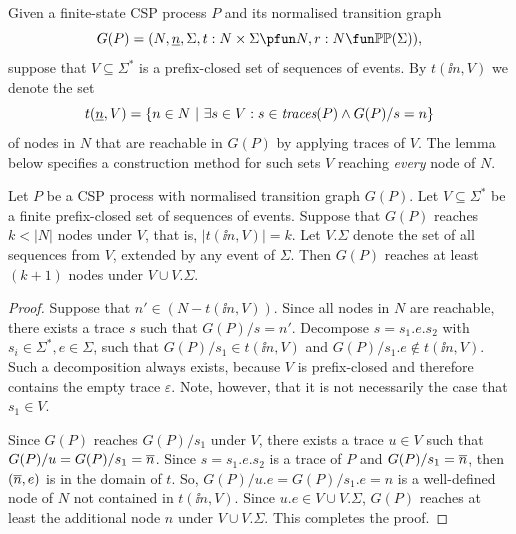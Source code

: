 
Given a finite-state CSP process $P$ and its normalised transition graph
\[
G(P) = ( N, \ii n, \Sigma, t : N\times\Sigma \pfun N, r : N \fun \mathbb{P}\mathbb{P}(\Sigma)),
\]
suppose that $V\subseteq\Sigma^*$ is a
prefix-closed set  of sequences of events. By $t(\ii n,V)$ we denote the set
\[
t(\underline{n},V) = \{ n\in N~|~\exists s\in V: s\in\text{\it traces}(P)\wedge G(P)/s = n \}
\]
of nodes in $N$ that are reachable in $G(P)$ by applying traces of $V$. The
lemma below specifies a construction method for such sets $V$ reaching {\it
every} node of $N$.

\begin{lemma}
\label{lemma:extendV} Let $P$ be a CSP process with normalised transition
graph $G(P)$. %
Let
$V\subseteq\Sigma^*$ be a finite prefix-closed set of sequences of events.
Suppose that  $G(P)$ reaches $k < |N|$ nodes under $V$, that is, $|t(\ii
n,V)| = k$. Let $V.\Sigma$ denote the set of all sequences from $V$, extended
by any event of $\Sigma$. Then $G(P)$ reaches at least $(k+1)$ nodes under
$V\cup V.\Sigma$.
\end{lemma}
\begin{proof}
Suppose that $n'\in (N - t(\ii n,V))$.  Since all nodes in $N$ are reachable,
there exists a trace $s$ such that $G(P)/s = n'$. Decompose $s = s_1.e.s_2$
with $s_i\in\Sigma^*, e\in\Sigma$, such that $G(P)/s_1 \in t(\ii n,V)$ and
$G(P)/s_1.e \not\in t(\ii n,V)$. Such a decomposition always exists, because
$V$ is prefix-closed and therefore contains the empty trace $\varepsilon$.
Note, however, that it is not necessarily the case that $s_1\in V$.

Since $G(P)$ reaches $G(P)/s_1$ under $V$, there exists a trace $u\in V$ such
that $G(P)/u = G(P)/s_1 = \overline n$. Since $s = s_1.e.s_2$ is a trace of $P$ and
$G(P)/s_1 = \overline n$, then $(\overline n,e)$ is in the domain of $t$. So, $ G(P)/u.e
= G(P)/s_1.e = n$ is a well-defined node of $N$ not contained in $t(\ii
n,V)$. Since $u.e\in V\cup V.\Sigma$, $G(P)$ reaches at least the additional
node $n$ under $V\cup V.\Sigma$. This completes the proof. \xbox
\end{proof}

